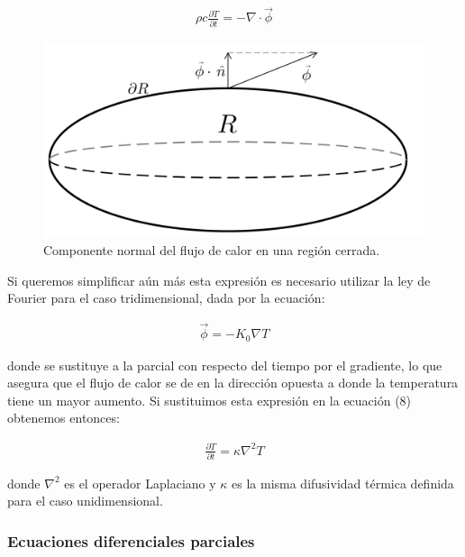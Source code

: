 \documentclass[12pt]{article}
\begin{document}
\begin{align}
    \rho c\frac{\partial T}{\partial t} = - \nabla \cdot\vec{\phi}
\end{align}

\begin{figure}[H]
\begin{center}
    \includegraphics[width=0.8\linewidth]{Region_R.png}
    \caption{Componente normal del flujo de calor en una región cerrada.}
\end{center}
\end{figure}

Si queremos simplificar aún más esta expresión es necesario utilizar la ley de Fourier para el caso tridimensional, dada por la ecuación:

\begin{align}
    \vec{\phi} = -K_0\nabla T
\end{align}

donde se sustituye a la parcial con respecto del tiempo por el gradiente, lo que asegura que el flujo de calor se de en la dirección opuesta a donde la temperatura tiene un mayor aumento. Si sustituimos esta expresión en la ecuación (8) obtenemos entonces:

\begin{align}
    \frac{\partial T}{\partial t} = \kappa \nabla^2 T
\end{align}

donde $\nabla^2$ es el operador Laplaciano y $\kappa$ es la misma difusividad térmica definida para el caso unidimensional.

\subsubsection{Ecuaciones diferenciales parciales}
\end{document}
